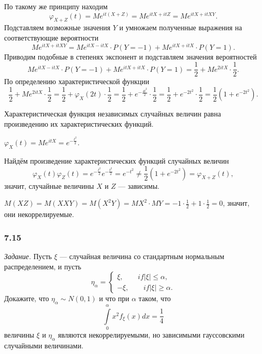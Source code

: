 По такому же принципу находим
$$ \varphi_{X + Z} \left( t \right) =
  Me^{it \left( X + Z \right) } =
  Me^{itX + itZ} =
  Me^{itX + itXY}.$$
Подставляем возможные значения $Y$ и умножаем полученные выражения на соответствующие вероятности
$$Me^{itX + itXY} =
  Me^{itX - itX} \cdot P \left( Y = -1 \right) + Me^{itX + itX} \cdot P \left( Y = 1 \right).$$
Приводим подобные в степенях экспонент и подставляем значения вероятностей
$$Me^{itX - itX} \cdot P \left( Y = -1 \right) + Me^{itX + itX} \cdot P \left( Y = 1 \right) =
  \frac{1}{2} + Me^{2itX} \cdot \frac{1}{2}.$$
По определению характеристической функции
$$ \frac{1}{2} + Me^{2itX} \cdot \frac{1}{2} =
  \frac{1}{2} + \varphi_X \left( 2t \right) \cdot \frac{1}{2} =
  \frac{1}{2} + e^{- \frac{4t^2}{2}} \cdot \frac{1}{2} =
  \frac{1}{2} + e^{-2t^2} \cdot \frac{1}{2} =
  \frac{1}{2} \left( 1 + e^{-2t^2} \right).$$

Характеристическая функция независимых случайных
величин равна произведению их характеристических функций.

$ \varphi_X \left( t \right) =
  Me^{itX} =
  e^{- \frac{t^2}{2}}$.

Найдём произведение характеристических функций случайных величин
$$ \varphi_X \left( t \right) \varphi_Z \left( t \right) =
  e^{- \frac{t^2}{2}} e^{- \frac{t^2}{2}} =
  e^{-t^2} \neq
  \frac{1}{2} \left( 1 + e^{-2t^2} \right) =
  \varphi_{X + Z} \left( t \right),$$
значит, случайные величины $X$ и $Z$ --- зависимы.

$M \left( XZ \right) =
  M \left( XXY \right) =
  M \left( X^2 Y \right) =
  MX^2 \cdot MY =
  -1 \cdot \frac{1}{2} + 1 \cdot \frac{1}{2} =
  0$,
значит, они некоррелируемые.


\subsubsection*{7.15}

\textit{Задание.}
Пусть $ \xi $ --- случайная величина со стандартным нормальным распределением, и пусть
$$ \eta_{ \alpha } =
  \begin{cases}
    \xi, \qquad if \left| \xi \right| \leq \alpha, \\
    - \xi, \qquad if \left| \xi \right| \geq \alpha.
  \end{cases}$$
Докажите, что $ \eta_{ \alpha } \sim N \left( 0, 1 \right) $ и что при $ \alpha $ таком, что
$$ \int \limits_0^{ \alpha } x^2 f_{ \xi } \left( x \right) dx =
  \frac{1}{4}$$
величины $ \xi $ и $ \eta_{ \alpha }$ являются некоррелируемыми,
но зависимыми гауссовскими случайными величинами.


